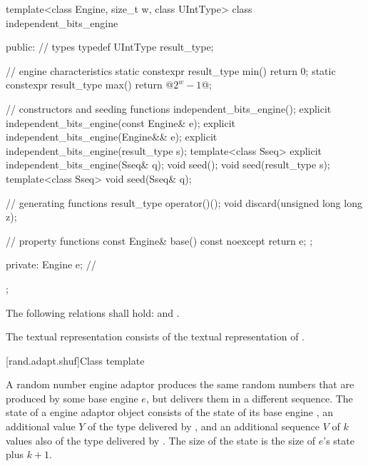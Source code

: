 \begin{codeblock}
template<class Engine, size_t w, class UIntType>
class independent_bits_engine
{
public:
 // types
 typedef UIntType result_type;

 // engine characteristics
 static constexpr result_type min() { return 0; }
 static constexpr result_type max() { return @$2^w - 1$@; }

 // constructors and seeding functions
 independent_bits_engine();
 explicit independent_bits_engine(const Engine& e);
 explicit independent_bits_engine(Engine&& e);
 explicit independent_bits_engine(result_type s);
 template<class Sseq> explicit independent_bits_engine(Sseq& q);
 void seed();
 void seed(result_type s);
 template<class Sseq> void seed(Sseq& q);

 // generating functions
 result_type operator()();
 void discard(unsigned long long z);

 // property functions
 const Engine& base() const noexcept { return e; };

private:
 Engine e;   // \expos
};
\end{codeblock}%

\pnum
The following relations shall hold:
and
  .

\pnum
The textual representation%
%
consists of
 the textual representation of .



[rand.adapt.shuf]{Class template }%
%

\pnum
A  random number engine adaptor
produces the same random numbers
that are produced by some base engine $e$,
but delivers them in a different sequence.
The state%
%
of a  engine adaptor object 
consists of
 the state  of its base engine ,
 an additional value $Y$ of the type delivered by ,
and
 an additional sequence $V$ of $k$ values
 also of the type delivered by .
The size of the state is
 the size of $e$'s state plus $k+1$.

